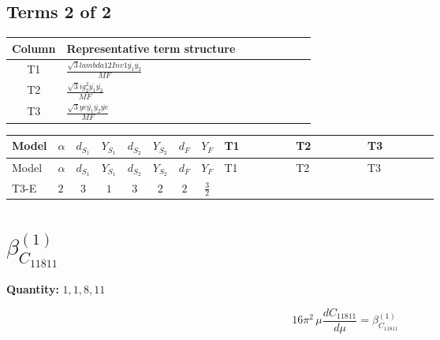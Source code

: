 \documentclass[8pt]{article}
\begin{document}
\begin{landscape}
\subsection*{Terms 2 of 2}
\begin{center}
\begin{tabular}{@{}c >{\raggedright\arraybackslash}p{0.82\linewidth}@{}}
\toprule
Column & Representative term structure \\
\midrule
T1 & \(\displaystyle \frac{\sqrt{3} lambda12Inv1 \overline{y_{1}} \overline{y_{2}}}{MF}\) \\
\midrule
T2 & \(\displaystyle \frac{\sqrt{3} i g_{2}^{2} \overline{y_{1}} \overline{y_{2}}}{MF}\) \\
\midrule
T3 & \(\displaystyle \frac{\sqrt{3} ye \overline{y_{1}} \overline{y_{2}} \overline{ye}}{MF}\) \\
\midrule
\bottomrule
\end{tabular}
\end{center}
\smallskip
\tiny
\begin{longtable}{@{}llcccccc >{\raggedright\arraybackslash}p{0.21\linewidth} >{\raggedright\arraybackslash}p{0.21\linewidth} >{\raggedright\arraybackslash}p{0.21\linewidth}@{}}
\toprule
Model & $\alpha$ & $d_{S_1}$ & $Y_{S_1}$ & $d_{S_2}$ & $Y_{S_2}$ & $d_F$ & $Y_F$ & T1 & T2 & T3 \\
\midrule
\endfirsthead
\toprule
Model & $\alpha$ & $d_{S_1}$ & $Y_{S_1}$ & $d_{S_2}$ & $Y_{S_2}$ & $d_F$ & $Y_F$ & T1 & T2 & T3 \\
\midrule
\endhead
T3-E & $2$ & $3$ & $1$ & $3$ & $2$ & $2$ & $\frac{3}{2}$ & \scriptsize\adjustbox{max width=\linewidth}{$\begin{gathered} \frac{\sqrt{3} lambda12Inv1 \overline{y_{1}} \overline{y_{2}}}{6 MF}\end{gathered}$} & \scriptsize\adjustbox{max width=\linewidth}{$\begin{gathered} \frac{\sqrt{3} i g_{2}^{2} \overline{y_{1}} \overline{y_{2}}}{6 MF}\end{gathered}$} & \scriptsize\adjustbox{max width=\linewidth}{$\begin{gathered} \frac{\sqrt{3} ye \overline{y_{1}} \overline{y_{2}} \overline{ye}}{12 MF}\end{gathered}$} \\
\midrule
\bottomrule
\end{longtable}
\clearpage
\section*{$\beta_{C_{11811}}^{(1)}$}
\noindent\textbf{Quantity: }$\mathrm{1,1,8,11}$\par\smallskip
\[16\pi^2\,\mu\frac{d C_{11811}}{d\mu}=\beta_{C_{11811}}^{(1)}\]

\end{landscape}
\end{document}
